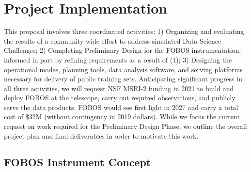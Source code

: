 \documentclass[oneside,11pt]{amsart}
\newcommand{\comment}[2][todo]{{\color{#1}[[{\bf #2}]]}}
\begin{document}
\section{Project Implementation}
\label{sec:project}

This proposal involves three coordinated activities: 1) Organizing and evaluating the results of a community-wide
effort to address simulated Data Science Challenges; 2) Completing Preliminary Design for the FOBOS
instrumentation, informed in part by refining requirements as a result of (1); 3) Designing the operational modes,
planning tools, data analysis software, and serving platforms necessary for delivery of public training sets.
Anticipating significant progress in all three activities, we will request NSF MSRI-2 funding in 2021 to build and
deploy FOBOS at the telescope, carry out required observations, and publicly serve the data products.  FOBOS would
see first light in 2027 and carry a total cost of \$32M (without contingency in 2019 dollars).  While we focus the
current request on work required for the Preliminary Design Phase, we outline the overall project plan and final
deliverables in order to motivate this work.

\subsection{FOBOS Instrument Concept}
\label{sec:concept}

\end{document}
